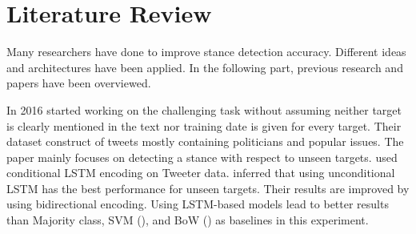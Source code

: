 \section{Literature Review}
\label{literature}
	Many researchers have done to improve stance detection accuracy. Different ideas and architectures have been applied. In the following part, previous research and papers have been overviewed.  
	
	In 2016 \cite{Augenstein2016StanceDW} started working on the challenging task without assuming neither target is clearly mentioned in the text nor training date is given for every target. Their dataset construct of tweets mostly containing politicians and popular issues. The paper mainly focuses on detecting a stance with respect to unseen targets. \cite{Augenstein2016StanceDW} used conditional LSTM encoding on Tweeter data. \cite{Augenstein2016StanceDW} inferred that using unconditional LSTM has the best performance for unseen targets. Their results are improved by using bidirectional encoding. Using LSTM-based models lead to better results than Majority class, SVM (\cite{svc}), and BoW (\cite{bow}) as baselines in this experiment.
	
